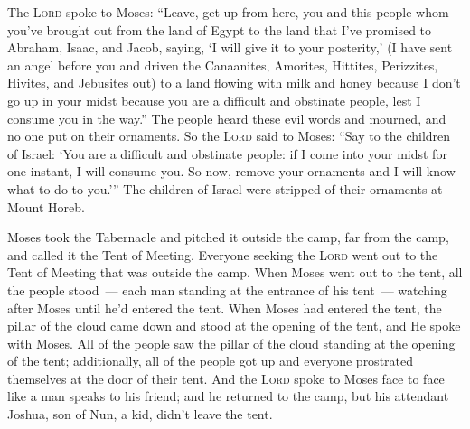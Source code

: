 
\begin{inparaenum}
   The \textsc{Lord} spoke to Moses: ``Leave, get up from here, you and this people whom you've brought out from the land of Egypt to the land that I've promised to Abraham, Isaac, and Jacob, saying, `I will give it to your posterity,'%
   (I have sent an angel before you and driven the Canaanites, Amorites, Hittites, Perizzites, Hivites, and Jebusites out)%
   to a land flowing with milk and honey because I don't go up in your midst because you are a difficult and obstinate people, lest I consume you in the way.''%
   The people heard these evil words and mourned, and no one put on their ornaments.%
   So the \textsc{Lord} said to Moses: ``Say to the children of Israel: `You are a difficult and obstinate people: if I come into your midst for one instant, I will consume you. So now, remove your ornaments and I will know what to do to you.'\thinspace''%
   The children of Israel were stripped of their ornaments at Mount Horeb.%
  
   Moses took the Tabernacle and pitched it outside the camp, far from the camp, and called it the Tent of Meeting. Everyone seeking the \textsc{Lord} went out to the Tent of Meeting that was outside the camp.%
   When Moses went out to the tent, all the people stood~--- each man standing at the entrance of his tent~--- watching after Moses until he'd entered the tent.%
   When Moses had entered the tent, the pillar of the cloud came down and stood at the opening of the tent, and He spoke with Moses.%
   All of the people saw the pillar of the cloud standing at the opening of the tent; additionally, all of the people got up and everyone prostrated themselves at the door of their tent.%
   And the \textsc{Lord} spoke to Moses face to face like a man speaks to his friend; and he returned to the camp, but his attendant Joshua, son of Nun, a kid, didn't leave the tent.%
  

\end{inparaenum}
